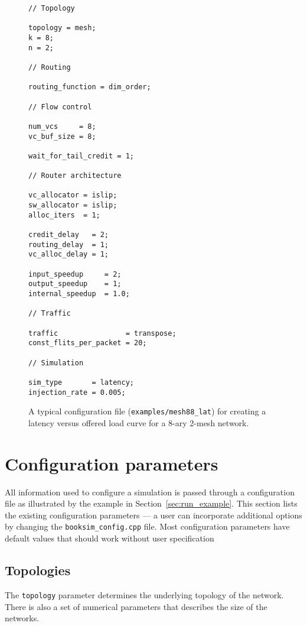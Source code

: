 \documentclass[11pt]{article}
\begin{document}
\begin{figure}
\begin{verbatim}
// Topology

topology = mesh;
k = 8;
n = 2;

// Routing

routing_function = dim_order;

// Flow control

num_vcs     = 8;
vc_buf_size = 8;

wait_for_tail_credit = 1;

// Router architecture

vc_allocator = islip;
sw_allocator = islip;
alloc_iters  = 1;

credit_delay   = 2;
routing_delay  = 1;
vc_alloc_delay = 1;

input_speedup     = 2;
output_speedup    = 1;
internal_speedup  = 1.0;

// Traffic

traffic                = transpose;
const_flits_per_packet = 20;

// Simulation

sim_type       = latency;
injection_rate = 0.005;
\end{verbatim}
\caption{A typical configuration file (\texttt{examples/mesh88\_lat})
for creating a latency versus offered load curve for a 8-ary 2-mesh
network.}
\label{fig:lat_vs_load}
\end{figure}

\section{Configuration parameters}
\label{sec:config_params}

All information used to configure a simulation is passed through a
configuration file as illustrated by the example in
Section~\ref{sec:run_example}.  This section lists the existing
configuration parameters --- a user can incorporate additional options
by changing the \texttt{booksim\_config.cpp} file. Most configuration parameters have default values that should work without user specification

\subsection{Topologies}
\label{sec:topos}

The \texttt{topology} parameter determines the underlying topology of the
network. There is also a set of numerical parameters that describes the size of the networks. 
\end{document}
